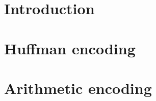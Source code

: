 \documentclass[draft, dawn]{lectures2}
\begin{document}
    \maketitle

    \section{Introduction}
    

    \section{Huffman encoding}
    

    \section{Arithmetic encoding}
    

    \printbibliography
    \printglossaries
\end{document}

